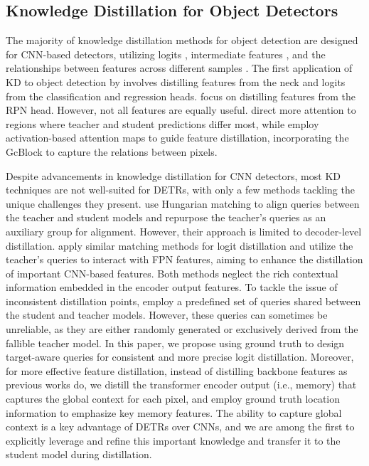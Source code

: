 \subsection{Knowledge Distillation for Object Detectors}

The majority of knowledge distillation methods for object detection are designed for CNN-based detectors, utilizing logits \cite{zheng2022localization}, intermediate features \cite{zhang2020improve}, and the relationships between features across different samples \cite{dai2021general}. The first application of KD to object detection by \cite{chen2017learning} involves distilling features from the neck and logits from the classification and regression heads. \citet{li2017mimicking} focus on distilling features from the RPN head. However, not all features are equally useful. 
\citet{dai2021general} direct more attention to regions where teacher and student predictions differ most, while \citet{yang2022focal} employ activation-based attention maps to guide feature distillation, incorporating the GcBlock \cite{cao2019gcnet} to capture the relations between pixels.

Despite advancements in knowledge distillation for CNN detectors, most KD techniques are not well-suited for DETRs, with only a few methods tackling the unique challenges they present.
\citet{ijcai2024p74} use Hungarian matching to align queries between the teacher and student models and repurpose the teacher’s queries as an auxiliary group for alignment. However, their approach is limited to decoder-level distillation. \citet{chang2023detrdistill} apply similar matching methods for logit distillation and utilize the teacher’s queries to interact with FPN features, aiming to enhance the distillation of important CNN-based features. Both methods neglect the rich contextual information embedded in the encoder output features.
To tackle the issue of inconsistent distillation points, \citet{wang2024knowledge} employ a predefined set of queries shared between the student and teacher models. However, these queries can sometimes be unreliable, as they are either randomly generated or exclusively derived from the fallible teacher model.
In this paper, we propose using ground truth to design target-aware queries for consistent and more precise logit distillation. Moreover, for more effective feature distillation, instead of distilling backbone features as previous works do, we distill the transformer encoder output (i.e., memory) that captures the global context for each pixel, and employ ground truth location information to emphasize key memory features.
The ability to capture global context is a key advantage of DETRs over CNNs, and we are among the first to explicitly leverage and refine this important knowledge and transfer it to the student model during distillation. 
